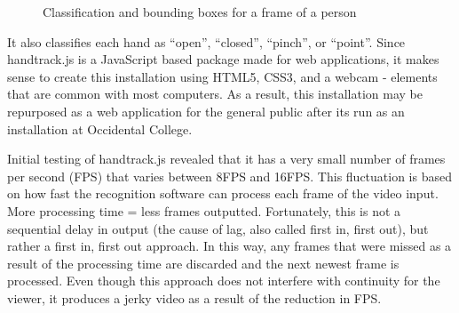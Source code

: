 \documentclass[10pt,twocolumn]{article}
\begin{document}
\begin{figure}[hbh]
\begin{center}
\vspace{.5cm}
\caption{Classification and bounding boxes for a frame of a person}
\label{fig:bounding_boxes}
\end{center}
\end{figure}

It also classifies each hand as ``open'', ``closed'', ``pinch'', or ``point''.  Since handtrack.js is a JavaScript based package made for web applications, it makes sense to create this installation using HTML5, CSS3, and a webcam - elements that are common with most computers.   As a result, this installation may be repurposed as a web application for the general public after its run as an installation at Occidental College. 

Initial testing of handtrack.js revealed that it has a very small number of frames per second (FPS) that varies between 8FPS and 16FPS.  This fluctuation is based on how fast the recognition software can process each frame of the video input. More processing time = less frames outputted.  Fortunately, this is not a sequential delay in output (the cause of lag, also called first in, first out), but rather a first in, first out approach.  In this way, any frames that were missed as a result of the processing time are discarded and the next newest frame is processed.  Even though this approach does not interfere with continuity for the viewer, it produces a jerky video as a result of the reduction in FPS.  
\end{document}
